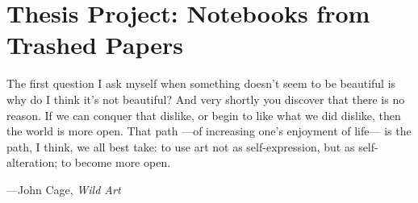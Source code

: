 \chapter{Thesis Project: Notebooks from Trashed Papers}


% 






\epigraph{The first question I ask myself when something doesn't seem to be beautiful is why do I think it's not beautiful? And very shortly you discover that there is no reason. If we can conquer that dislike, or begin to like what we did dislike, then the world is more open. That path ---of increasing one's enjoyment of life--- is the path, I think, we all best take: to use art not as self-expression, but as self-alteration; to become more open.}{\hfill---John Cage, \textit{Wild Art}}


